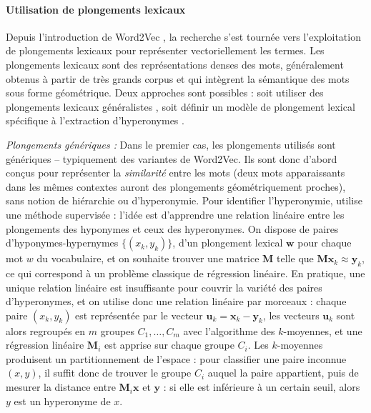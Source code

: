\paragraph{Utilisation de plongements lexicaux}

Depuis l'introduction de Word2Vec \cite{mikolov2013distributed}, la recherche s'est tournée vers l'exploitation de plongements lexicaux pour représenter vectoriellement les termes. Les plongements lexicaux sont des représentations denses des mots, généralement obtenus à partir de très grands corpus et qui intègrent la sémantique des mots sous forme géométrique.
Deux approches sont possibles : soit utiliser des plongements lexicaux généralistes \cite{fu2014learning, gupta2016domain, atzori2020fully, pocostales-2016-nuig}, soit définir un modèle de plongement lexical spécifique à l'extraction d'hyperonymes \cite{nguyen-etal-2017-hierarchical, nickel2017poincare, nickel2018learning, yu2015learning, luu-etal-2016-learning, vendrov2015order}. 

\textit{Plongements génériques :}
Dans le premier cas, les plongements utilisés sont génériques – typiquement des variantes de Word2Vec. Ils sont donc d'abord conçus pour représenter la \textit{similarité} entre les mots (deux mots apparaissants dans les mêmes contextes auront des plongements géométriquement proches), sans notion de hiérarchie ou d'hyperonymie. Pour identifier l'hyperonymie, \cite{fu2014learning} utilise une méthode supervisée : l'idée est d'apprendre une relation linéaire entre les plongements des hyponymes et ceux des hyperonymes. On dispose de paires d'hyponymes-hypernymes $\{(x_k, y_k )\}$, d'un plongement lexical $\textbf{w}$ pour chaque mot $w$ du vocabulaire, et on souhaite trouver une matrice $\textbf{M}$ telle que $\textbf{M} \textbf{x}_k \approx \textbf{y}_k$, ce qui correspond à un problème classique de régression linéaire. En pratique, une unique relation linéaire est insuffisante pour couvrir la variété des paires d'hyperonymes, et on utilise donc une relation linéaire par morceaux : chaque paire $(x_k, y_k)$ est représentée par le vecteur $\textbf{u}_k = \textbf{x}_k - \textbf{y}_k$, les vecteurs $\textbf{u}_k$ sont alors regroupés en $m$ groupes $C_1, \ldots, C_m$ avec l'algorithme des $k$-moyennes, et une régression linéaire $\textbf{M}_i$ est apprise sur chaque groupe $C_i$. Les $k$-moyennes produisent un partitionnement de l'espace : pour classifier une paire inconnue $(x, y)$, il suffit donc de trouver le groupe $C_i$ auquel la paire appartient, puis de mesurer la distance entre $\textbf{M}_i \textbf{x}$ et $\textbf{y}$ : si elle est inférieure à un certain seuil, alors $y$ est un hyperonyme de $x$.

